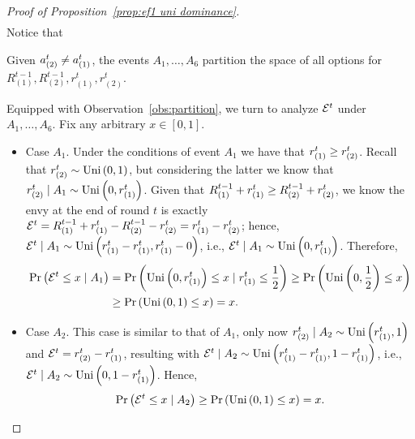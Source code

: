\begin{proof}[Proof of Proposition~\ref{prop:ef1 uni dominance}]
\begin{align*}
\end{align*}
Notice that 
\begin{observation}\label{obs:partition}
Given $a_{(2)}^t \neq a_{(1)}^t$, the events $A_1, \dots, A_6$ partition the space of all options for $R^{t-1}_{(1)}, R^{t-1}_{(2)}, r^t_{(1)}, r^t_{(2)}$.
\end{observation}
Equipped with Observation~\ref{obs:partition}, we turn to analyze $\mathcal{E}^t$ under $A_1, \dots, A_6$. Fix any arbitrary $x \in [0,1]$.
\begin{itemize}
    \item Case $A_1$.
    Under the conditions of event $A_1$ we have that $r_{(1)}^t \geq  r_{(2)}^t$.
    Recall that $r_{(2)}^t \sim \text{Uni}\left(0,1\right)$, but considering the latter we know that $ r_{(2)}^t\mid A_1 \sim \text{Uni}\left(0,r_{(1)}^t\right)$.
    Given that $R^{t-1}_{(1)} + r_{(1)}^t \geq R^{t-1}_{(2)} + r_{(2)}^t$, we know the envy at the end of round $t$ is exactly $\mathcal{E}^t = R^{t-1}_{(1)} + r_{(1)}^t - R^{t-1}_{(2)} - r_{(2)}^t = r_{(1)}^t -r_{(2)}^t$;
    hence, $\mathcal{E}^{t}\mid A_1 \sim \text{Uni}\left(r_{(1)}^t - r_{(1)}^t,r_{(1)}^t - 0\right)$, i.e., $\mathcal{E}^{t}\mid A_1 \sim \text{Uni}\left(0,r_{(1)}^t\right)$. Therefore,
    \begin{align*}
        \Pr\left( \mathcal{E}^t \leq x \mid A_1 \right) & = \Pr\left( \text{Uni}\left(0, r^t_{(1)}\right)\leq x \mid r^t_{(1)} \leq \frac{1}{2} \right) \geq \Pr\left( \text{Uni}\left(0, \frac{1}{2}\right) \leq x \right)
        \\& \geq \Pr\left( \text{Uni}\left(0, 1\right) \leq x \right) = x.
    \end{align*}

    \item Case $A_2$.
    This case is similar to that of $A_1$, only now $ r_{(2)}^t\mid A_2 \sim \text{Uni}\left(r_{(1)}^t, 1\right)$ and $\mathcal{E}^t = r_{(2)}^t -r_{(1)}^t$, resulting with $\mathcal{E}^{t}\mid A_2 \sim \text{Uni}\left(r_{(1)}^t - r_{(1)}^t,1 -r_{(1)}^t\right)$, i.e., $\mathcal{E}^{t}\mid A_2 \sim \text{Uni}\left(0,1 -r_{(1)}^t\right)$.
    Hence,
    \begin{align*}
        \Pr\left( \mathcal{E}^t \leq x \mid A_2  \right) \geq \Pr\left( \text{Uni}\left(0, 1\right) \leq x \right) = x.
    \end{align*}


\end{itemize}
\end{proof}
